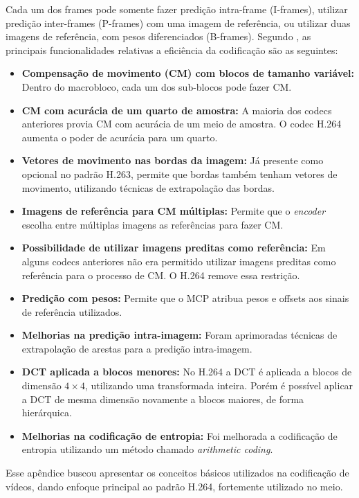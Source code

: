\documentclass[cic,tc]{iiufrgs}
\begin{document}
Cada um dos frames pode somente fazer predição intra-frame (I-frames), utilizar 
predição inter-frames (P-frames) com uma imagem de referência, ou utilizar 
duas imagens de referência, com pesos diferenciados (B-frames).
Segundo \citet{WiegangH264}, as principais funcionalidades relativas a eficiência
da codificação são as seguintes:
\begin{itemize}
    \item \textbf{Compensação de movimento (CM) com blocos de tamanho variável:}
    Dentro do macrobloco, cada um dos sub-blocos pode fazer CM.
    \item \textbf{CM com acurácia de um quarto de amostra:} A maioria dos codecs anteriores 
    provia CM com acurácia de um meio de amostra. O codec H.264 aumenta o poder 
    de acurácia para um quarto.
    \item \textbf{Vetores de movimento nas bordas da imagem:} Já presente como opcional
    no padrão H.263, permite que bordas também tenham vetores de movimento, utilizando
    técnicas de extrapolação das bordas.
    \item \textbf{Imagens de referência para CM múltiplas:} Permite que o \textit{encoder}
    escolha entre múltiplas imagens as referências para fazer CM.
    \item \textbf{Possibilidade de utilizar imagens preditas como referência:} Em alguns 
    codecs anteriores não era permitido utilizar imagens preditas como referência para o 
    processo de CM. O H.264 remove essa restrição.
    \item \textbf{Predição com pesos:} Permite que o MCP atribua pesos e offsets aos 
    sinais de referência utilizados.
    \item \textbf{Melhorias na predição intra-imagem:} Foram aprimoradas técnicas de
    extrapolação de arestas para a predição intra-imagem.
    \item \textbf{DCT aplicada a blocos menores:} No H.264 a DCT é aplicada a blocos de 
    dimensão $4\times4$, utilizando uma transformada inteira. Porém é possível aplicar 
    a DCT de mesma dimensão novamente a blocos maiores, de forma hierárquica.
    \item \textbf{Melhorias na codificação de entropia:} Foi melhorada a codificação de 
    entropia utilizando um método chamado \emph{arithmetic coding}.
\end{itemize}

Esse apêndice buscou apresentar os conceitos básicos utilizados na codificação de vídeos, 
dando enfoque principal ao padrão H.264, fortemente utilizado no meio.
\newpage
\end{document}
